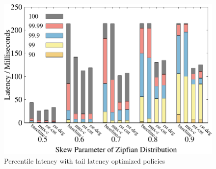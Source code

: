 \begin{figure}[t]
\begin{minipage}[b]{0.32\linewidth}
        \label{fig:restart:abort}
    \end{minipage}
    \begin{minipage}[b]{0.32\linewidth}
            \centering
            \includegraphics[width=\textwidth]{./exp_fig/restart/percent100_latency}
            \vspace{-2em}
            \caption{Percentile latency with tail latency optimized policies}
            \label{fig:restart:p100}
        \end{minipage}
    \vspace{-1em}
\end{figure}


